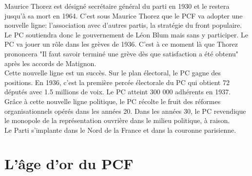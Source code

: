 \documentclass[10pt, a4paper, openany]{book}
\begin{document}
Maurice Thorez est désigné secrétaire général du parti en 1930 et le restera jusqu'à sa mort en 1964. C'est sous Maurice Thorez que le PCF va adopter une nouvelle ligne: l'association avec d'autres partis, la stratégie du front populaire. Le PC soutiendra donc le gouvernement de Léon Blum mais sans y participer. Le PC va jouer un rôle dans les grèves de 1936. C'est à ce moment là que Thorez prononcera "Il faut savoir terminé une grève dès que satisfaction a été obtenu" après les accords de Matignon.\\
Cette nouvelle ligne est un succès. Sur le plan électoral, le PC gagne des positions. En 1936, c'est la première percée électorale du PC qui obtient 72 députés avec 1.5 millions de voix. Le PC atteint 300 000 adhérents en 1937. \\
Grâce à cette nouvelle ligne politique, le PC récolte le fruit des réformes organisationnels opérés dans les années 20. Dans les années 30, le PC revendique le monopole de la représentation ouvrière dans le milieu politique, à raison. \\
Le Parti s'implante dans le Nord de la France et dans la couronne parisienne. 

\section{L'âge d'or du PCF}
\end{document}
